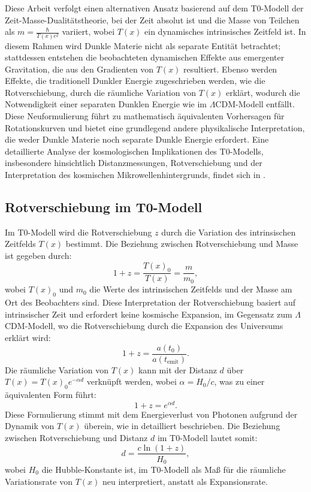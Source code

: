 \documentclass[12pt,a4paper]{article}
\newcommand{\Tfield}{T(x)}
\begin{document}
	Diese Arbeit verfolgt einen alternativen Ansatz basierend auf dem T0-Modell der Zeit-Masse-Dualitätstheorie, bei der Zeit absolut ist und die Masse von Teilchen als \( m = \frac{\hbar}{\Tfield c^2} \) variiert, wobei \( \Tfield \) ein dynamisches intrinsisches Zeitfeld ist. In diesem Rahmen wird Dunkle Materie nicht als separate Entität betrachtet; stattdessen entstehen die beobachteten dynamischen Effekte aus emergenter Gravitation, die aus den Gradienten von \( \Tfield \) resultiert. Ebenso werden Effekte, die traditionell Dunkler Energie zugeschrieben werden, wie die Rotverschiebung, durch die räumliche Variation von \( \Tfield \) erklärt, wodurch die Notwendigkeit einer separaten Dunklen Energie wie im \(\Lambda\)CDM-Modell entfällt. Diese Neuformulierung führt zu mathematisch äquivalenten Vorhersagen für Rotationskurven und bietet eine grundlegend andere physikalische Interpretation, die weder Dunkle Materie noch separate Dunkle Energie erfordert. Eine detaillierte Analyse der kosmologischen Implikationen des T0-Modells, insbesondere hinsichtlich Distanzmessungen, Rotverschiebung und der Interpretation des kosmischen Mikrowellenhintergrunds, findet sich in \cite{pascher_messdifferenzen_2025}.
	
	\subsection{Rotverschiebung im T0-Modell}
	Im T0-Modell wird die Rotverschiebung \( z \) durch die Variation des intrinsischen Zeitfelds \( \Tfield \) bestimmt. Die Beziehung zwischen Rotverschiebung und Masse ist gegeben durch:
	\begin{equation}
		1 + z = \frac{\Tfield_0}{\Tfield} = \frac{m}{m_0},
	\end{equation}
	wobei \( \Tfield_0 \) und \( m_0 \) die Werte des intrinsischen Zeitfelds und der Masse am Ort des Beobachters sind. Diese Interpretation der Rotverschiebung basiert auf intrinsischer Zeit und erfordert keine kosmische Expansion, im Gegensatz zum \(\Lambda\)CDM-Modell, wo die Rotverschiebung durch die Expansion des Universums erklärt wird:
	\begin{equation}
		1 + z = \frac{a(t_0)}{a(t_{\text{emit}})}.
	\end{equation}
	Die räumliche Variation von \( \Tfield \) kann mit der Distanz \( d \) über \( \Tfield = \Tfield_0 e^{-\alpha d} \) verknüpft werden, wobei \( \alpha = H_0/c \), was zu einer äquivalenten Form führt:
	\begin{equation}
		1 + z = e^{\alpha d}.
	\end{equation}
	Diese Formulierung stimmt mit dem Energieverlust von Photonen aufgrund der Dynamik von \( \Tfield \) überein, wie in \cite{pascher_messdifferenzen_2025} detailliert beschrieben. Die Beziehung zwischen Rotverschiebung und Distanz \( d \) im T0-Modell lautet somit:
	\begin{equation}
		d = \frac{c \ln(1 + z)}{H_0},
	\end{equation}
	wobei \( H_0 \) die Hubble-Konstante ist, im T0-Modell als Maß für die räumliche Variationsrate von \( \Tfield \) neu interpretiert, anstatt als Expansionsrate.
	
\end{document}
